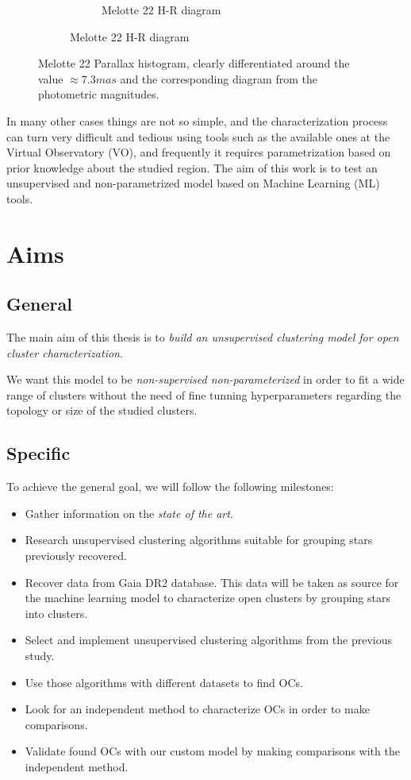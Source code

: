 \documentclass[11pt, a4paper, english]{book}
\begin{document}
\begin{figure}[htbp]
\begin{subfigure}{0.9\textwidth}
\begin{subfigure}[t]{0.45\textwidth}
      \caption{Melotte 22 H-R diagram}
    \end{subfigure}
  \end{subfigure}
  \caption{Melotte 22 Parallax histogram, clearly differentiated around the value $\approx 7.3mas$ and the corresponding diagram from the photometric magnitudes.}
  \label{fig:melotte_22_pm_parallax}
\end{figure}

In many other cases things are not so simple, and the characterization process can turn very difficult and tedious using tools such as the available ones at
the Virtual Observatory (VO), and frequently it requires parametrization based on prior knowledge about the studied region. The aim of this work is to test
an unsupervised and non-parametrized model based on Machine Learning (ML) tools.

\chapter{Aims}

\section{General}

The main aim of this thesis is to \emph{build an unsupervised clustering model for open cluster characterization}.

We want this model to be \emph{non-supervised non-parameterized} in order to fit a wide range of clusters without
the need of fine tunning hyperparameters regarding the topology or size of the studied clusters.

\section{Specific}

To achieve the general goal, we will follow the following milestones:

\begin{itemize}
  \item Gather information on the \emph{state of the art}.
  \item Research unsupervised clustering algorithms suitable for grouping stars previously recovered.
  \item Recover data from Gaia DR2 database. This data will be taken as source for the machine learning model to characterize open clusters
  by grouping stars into clusters.
  \item Select and implement unsupervised clustering algorithms from the previous study.
  \item Use those algorithms with different datasets to find OCs.
  \item Look for an independent method to characterize OCs in order to make comparisons.
  \item Validate found OCs with our custom model by making comparisons with the independent method.
\end{itemize}
\end{document}
